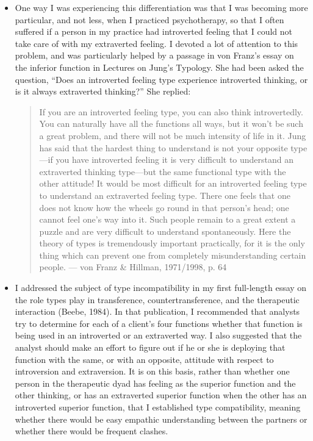\begin{itemize}
\item One way I was experiencing this differentiation was that I was becoming
more particular, and not less, when I practiced psychotherapy, so that I often
suffered if a person in my practice had introverted feeling that I could not
take care of with my extraverted feeling. I devoted a lot of attention to this
problem, and was particularly helped by a passage in von Franz’s essay on the
inferior function in Lectures on Jung’s Typology. She had been asked the
question, “Does an introverted feeling type experience introverted thinking, or
is it always extraverted thinking?” She replied:
\begin{quote}
If you are an introverted feeling type, you can also think introvertedly. You
can naturally have all the functions all ways, but it won’t be such a great
problem, and there will not be much intensity of life in it. Jung has said that
the hardest thing to understand is not your opposite type—if you have
introverted feeling it is very difficult to understand an extraverted thinking
type—but the same functional type with the other attitude! It would be most
difficult for an introverted feeling type to understand an extraverted feeling
type. There one feels that one does not know how the wheels go round in that
person’s head; one cannot feel one’s way into it. Such people remain to a great
extent a puzzle and are very difficult to understand spontaneously. Here the
theory of types is tremendously important practically, for it is the only thing
which can prevent one from completely misunderstanding certain people.
--- von Franz \& Hillman, 1971/1998, p. 64
\end{quote}

\item I addressed the subject of type incompatibility in my first full-length
essay on the role types play in transference, countertransference, and the
therapeutic interaction (Beebe, 1984). In that publication, I recommended that
analysts try to determine for each of a client’s four functions whether that
function is being used in an introverted or an extraverted way. I also
suggested that the analyst should make an effort to figure out if he or she is
deploying that function with the same, or with an opposite, attitude with
respect to introversion and extraversion. It is on this basis, rather than
whether one person in the therapeutic dyad has feeling as the superior function
and the other thinking, or has an extraverted superior function when the other
has an introverted superior function, that I established type compatibility,
meaning whether there would be easy empathic understanding between the partners
or whether there would be frequent clashes.


\end{itemize}
